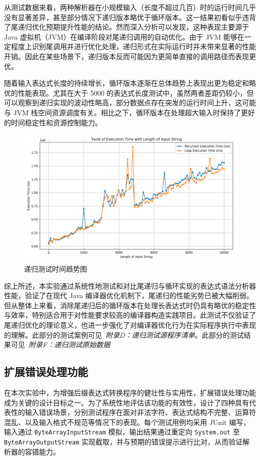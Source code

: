 \documentclass[a4paper, twoside, utf8]{ctexart}
\begin{document}
    从测试数据来看，两种解析器在小规模输入（长度不超过几百）时的运行时间几乎没有显著差异，甚至部分情况下递归版本略优于循环版本。这一结果初看似乎违背了尾递归优化预期提升性能的结论。然而深入分析可以发现，这种表现主要源于 Java 虚拟机（JVM）在编译阶段对尾递归调用的自动优化。由于 JVM 能够在一定程度上识别尾调用并进行优化处理，递归形式在实际运行时并未带来显著的性能开销。因此在某些场景下，递归版本反而可能因为更简单直接的调用路径而表现更优。
    
    随着输入表达式长度的持续增长，循环版本逐渐在总体趋势上表现出更为稳定和略优的性能表现。尤其在大于 5000 的表达式长度测试中，虽然两者差距仍较小，但可以观察到递归实现的波动性略高，部分数据点存在突发的运行时间上升，这可能与 JVM 栈空间资源调度有关。相比之下，循环版本在处理超大输入时保持了更好的时间稳定性和资源控制能力。

    \begin{figure}[htbp]
        \centering
        \includegraphics[width=0.5\linewidth]{figure/TimeTrend.png}
        \caption{递归测试时间趋势图}
    \end{figure}
    
    综上所述，本实验通过系统性地测试和对比尾递归与循环实现的表达式语法分析器性能，验证了在现代 Java 编译器优化机制下，尾递归的性能劣势已被大幅削弱。但从整体上来看，消除尾递归后的循环版本在处理长表达式时仍具有略优的稳定性与效率，特别适合用于对性能要求较高的编译器构造实践项目。此测试不仅验证了尾递归优化的理论意义，也进一步强化了对编译器优化行为在实际程序执行中表现的理解。此部分的测试案例可见\ \textit{附录D：递归测试源程序清单}。此部分的测试结果可见\ \textit{附录F：递归测试原始数据}

    \subsection{扩展错误处理功能}

    在本次实验中，为增强后缀表达式转换程序的健壮性与实用性，扩展错误处理功能成为关键的设计目标之一。为了系统性地评估该功能的有效性，设计了四种具有代表性的输入错误场景，分别测试程序在面对非法字符、表达式结构不完整、运算符混乱、以及输入格式不规范等情况下的表现。每个测试用例均采用 JUnit 编写，输入通过 \verb|ByteArrayInputStream| 模拟，输出结果通过重定向 \verb|System.out| 至 \verb|ByteArrayOutputStream| 实现截取，并与预期的错误提示进行比对，从而验证解析器的容错能力。
\end{document}
